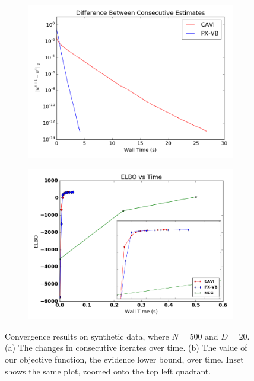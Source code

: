\documentclass{article}
\begin{document}
\begin{figure}[tb]
    \begin{subfigure}[t]{0.49\textwidth}
        \includegraphics[width=\textwidth]{Probit_synth/CAVI_PX_convergence.png}
        \subcaption{}
    \end{subfigure}
          \begin{subfigure}[t]{0.49\textwidth}
        \includegraphics[width=\textwidth]{Probit_synth/elbo_timeII.png}
        \subcaption{}
    \end{subfigure}
    \caption{Convergence results on synthetic data, where $N = 500$ and $D = 20$. (a) The changes in consecutive iterates over time.  (b) The value of our objective function, the evidence lower bound, over time. Inset shows the same plot, zoomed onto the top left quadrant.}
    \label{fig:Probit_synth}
\end{figure}
\end{document}
